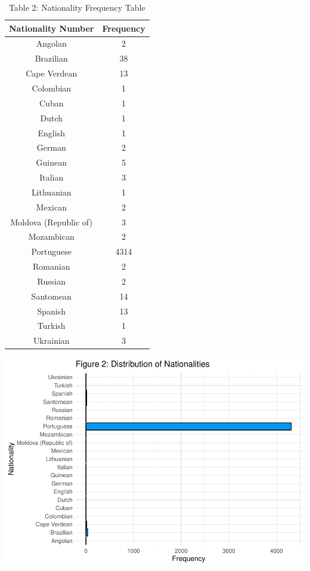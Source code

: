 \documentclass[
]{article}
\begin{document}
\begin{table}

\caption{\label{tab:unnamed-chunk-7}Table 2: Nationality Frequency Table}
\centering
\begin{tabular}[t]{c|c}
\hline
Nationality Number & Frequency\\
\hline
Angolan & 2\\
\hline
Brazilian & 38\\
\hline
Cape Verdean & 13\\
\hline
Colombian & 1\\
\hline
Cuban & 1\\
\hline
Dutch & 1\\
\hline
English & 1\\
\hline
German & 2\\
\hline
Guinean & 5\\
\hline
Italian & 3\\
\hline
Lithuanian & 1\\
\hline
Mexican & 2\\
\hline
Moldova (Republic of) & 3\\
\hline
Mozambican & 2\\
\hline
Portuguese & 4314\\
\hline
Romanian & 2\\
\hline
Russian & 2\\
\hline
Santomean & 14\\
\hline
Spanish & 13\\
\hline
Turkish & 1\\
\hline
Ukrainian & 3\\
\hline
\end{tabular}
\end{table}

\begin{center}\includegraphics{finalproj_files/figure-latex/unnamed-chunk-7-1} \end{center}
\end{document}
